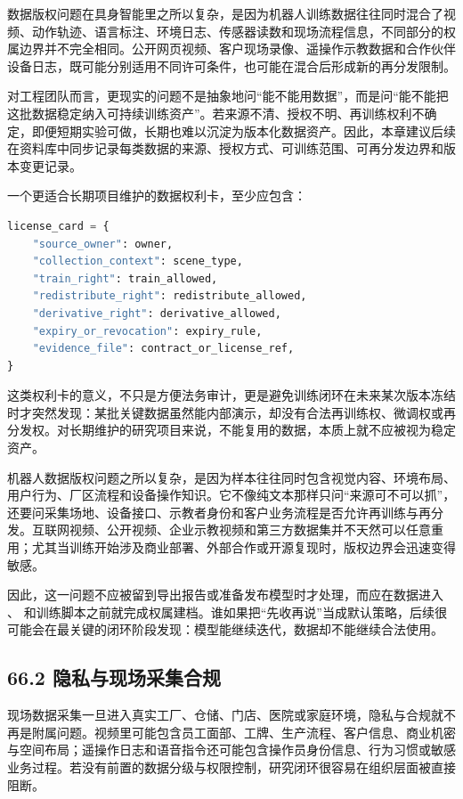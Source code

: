 数据版权问题在具身智能里之所以复杂，是因为机器人训练数据往往同时混合了视频、动作轨迹、语言标注、环境日志、传感器读数和现场流程信息，不同部分的权属边界并不完全相同。公开网页视频、客户现场录像、遥操作示教数据和合作伙伴设备日志，既可能分别适用不同许可条件，也可能在混合后形成新的再分发限制。

对工程团队而言，更现实的问题不是抽象地问“能不能用数据”，而是问“能不能把这批数据稳定纳入可持续训练资产”。若来源不清、授权不明、再训练权利不确定，即便短期实验可做，长期也难以沉淀为版本化数据资产。因此，本章建议后续在资料库中同步记录每类数据的来源、授权方式、可训练范围、可再分发边界和版本变更记录。

一个更适合长期项目维护的数据权利卡，至少应包含：

\begin{lstlisting}[language=python]
license_card = {
    "source_owner": owner,
    "collection_context": scene_type,
    "train_right": train_allowed,
    "redistribute_right": redistribute_allowed,
    "derivative_right": derivative_allowed,
    "expiry_or_revocation": expiry_rule,
    "evidence_file": contract_or_license_ref,
}
\end{lstlisting}

这类权利卡的意义，不只是方便法务审计，更是避免训练闭环在未来某次版本冻结时才突然发现：某批关键数据虽然能内部演示，却没有合法再训练权、微调权或再分发权。对长期维护的研究项目来说，不能复用的数据，本质上就不应被视为稳定资产。

机器人数据版权问题之所以复杂，是因为样本往往同时包含视觉内容、环境布局、用户行为、厂区流程和设备操作知识。它不像纯文本那样只问“来源可不可以抓”，还要问采集场地、设备接口、示教者身份和客户业务流程是否允许再训练与再分发。互联网视频、公开视频、企业示教视频和第三方数据集并不天然可以任意重用；尤其当训练开始涉及商业部署、外部合作或开源复现时，版权边界会迅速变得敏感。

因此，这一问题不应被留到导出报告或准备发布模型时才处理，而应在数据进入 、 和训练脚本之前就完成权属建档。谁如果把“先收再说”当成默认策略，后续很可能会在最关键的闭环阶段发现：模型能继续迭代，数据却不能继续合法使用。

\subsection*{66.2 隐私与现场采集合规}


现场数据采集一旦进入真实工厂、仓储、门店、医院或家庭环境，隐私与合规就不再是附属问题。视频里可能包含员工面部、工牌、生产流程、客户信息、商业机密与空间布局；遥操作日志和语音指令还可能包含操作员身份信息、行为习惯或敏感业务过程。若没有前置的数据分级与权限控制，研究闭环很容易在组织层面被直接阻断。


